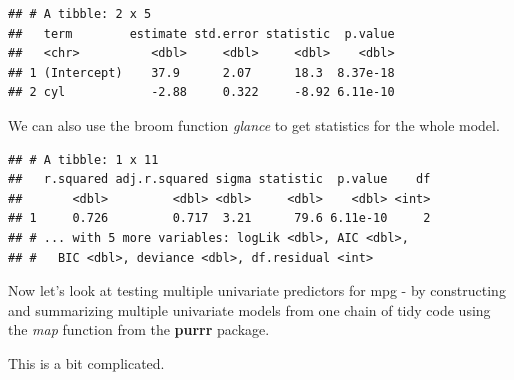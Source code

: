 \documentclass[
]{book}
\newenvironment{Shaded}{\begin{snugshade}}{\end{snugshade}}
\newcommand{\KeywordTok}[1]{\textcolor[rgb]{0.13,0.29,0.53}{\textbf{#1}}}
\newcommand{\NormalTok}[1]{#1}
\newcommand{\OperatorTok}[1]{\textcolor[rgb]{0.81,0.36,0.00}{\textbf{#1}}}
\newcommand{\StringTok}[1]{\textcolor[rgb]{0.31,0.60,0.02}{#1}}
\begin{document}
\begin{verbatim}
## # A tibble: 2 x 5
##   term        estimate std.error statistic  p.value
##   <chr>          <dbl>     <dbl>     <dbl>    <dbl>
## 1 (Intercept)    37.9      2.07      18.3  8.37e-18
## 2 cyl            -2.88     0.322     -8.92 6.11e-10
\end{verbatim}

We can also use the broom function \emph{glance} to get statistics for the whole model.

\begin{Shaded}
\end{Shaded}

\begin{verbatim}
## # A tibble: 1 x 11
##   r.squared adj.r.squared sigma statistic  p.value    df
##       <dbl>         <dbl> <dbl>     <dbl>    <dbl> <int>
## 1     0.726         0.717  3.21      79.6 6.11e-10     2
## # ... with 5 more variables: logLik <dbl>, AIC <dbl>,
## #   BIC <dbl>, deviance <dbl>, df.residual <int>
\end{verbatim}

Now let's look at testing multiple univariate predictors for mpg - by constructing and summarizing multiple univariate models from one chain of tidy code using the \emph{map} function from the \textbf{purrr} package.

This is a bit complicated.
\end{document}
